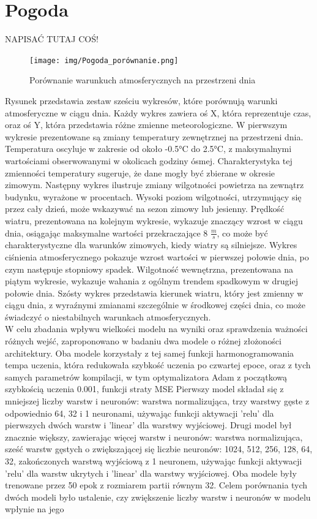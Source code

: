 \documentclass[a4paper,twoside,12pt]{book}
\begin{document}
\chapter{Pogoda}
\label{ch:0X}

NAPISAĆ TUTAJ COŚ!\\

\begin{figure}[!h]
  \centering
  \texttt{[image: img/Pogoda\_porównanie.png]}
  \caption{Porównanie warunkuch atmosferycznych na przestrzeni dnia}
  \label{fig:etykieta-rysunku}
\end{figure}
Rysunek przedstawia zestaw sześciu wykresów, które porównują warunki atmosferyczne w ciągu dnia. Każdy wykres zawiera oś X, która reprezentuje czas, oraz oś Y, która przedstawia różne zmienne meteorologiczne. W pierwszym wykresie prezentowane są zmiany temperatury zewnętrznej na przestrzeni dnia. Temperatura oscyluje w zakresie od około -0.5°C do 2.5°C, z maksymalnymi wartościami obserwowanymi w okolicach godziny ósmej. Charakterystyka tej zmienności temperatury sugeruje, że dane mogły być zbierane w okresie zimowym. Następny wykres ilustruje zmiany wilgotności powietrza na zewnątrz budynku, wyrażone w procentach. Wysoki poziom wilgotności, utrzymujący się przez cały dzień, może wskazywać na sezon zimowy lub jesienny. Prędkość wiatru, prezentowana na kolejnym wykresie, wykazuje znaczący wzrost w ciągu dnia, osiągając maksymalne wartości przekraczające 8  $\frac{m}{s}$, co może być charakterystyczne dla warunków zimowych, kiedy wiatry są silniejsze. Wykres ciśnienia atmosferycznego pokazuje wzrost wartości w pierwszej połowie dnia, po czym następuje stopniowy spadek. Wilgotność wewnętrzna, prezentowana na piątym wykresie, wykazuje wahania z ogólnym trendem spadkowym w drugiej połowie dnia. Szósty wykres przedstawia kierunek wiatru, który jest zmienny w ciągu dnia, z wyraźnymi zmianami szczególnie w środkowej części dnia, co może świadczyć o niestabilnych warunkach atmosferycznych.\\

W celu zbadania wpływu wielkości modelu na wyniki oraz sprawdzenia ważności różnych wejść, zaproponowano w badaniu dwa modele o różnej złożoności architektury. Oba modele korzystały z tej samej funkcji harmonogramowania tempa uczenia, która redukowała szybkość uczenia po czwartej epoce, oraz z tych samych parametrów kompilacji, w tym optymalizatora Adam z początkową szybkością uczenia 0.001, funkcji straty MSE
Pierwszy model składał się z mniejszej liczby warstw i neuronów: warstwa normalizująca, trzy warstwy gęste z odpowiednio 64, 32 i 1 neuronami, używając funkcji aktywacji 'relu' dla pierwszych dwóch warstw i 'linear' dla warstwy wyjściowej.
Drugi model był znacznie większy, zawierając więcej warstw i neuronów: warstwa normalizująca, sześć warstw gęstych o zwiększającej się liczbie neuronów: 1024, 512, 256, 128, 64, 32, zakończonych warstwą wyjściową z 1 neuronem, używając funkcji aktywacji 'relu' dla warstw ukrytych i 'linear' dla warstwy wyjściowej.
Oba modele były trenowane przez 50 epok z rozmiarem partii równym 32. Celem porównania tych dwóch modeli było ustalenie, czy zwiększenie liczby warstw i neuronów w modelu wpłynie na jego
\end{document}
